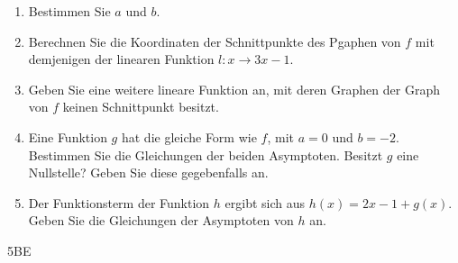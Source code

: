 \documentclass[a4paper,12pt]{article}
\begin{document}
    \begin{enumerate}[label={\alph*)}]
         \item Bestimmen Sie $a$ und $b$.
         \item Berechnen Sie die Koordinaten der Schnittpunkte des Pgaphen von $f$ mit demjenigen der linearen Funktion $l:x\rightarrow3x-1$.
         \item Geben Sie eine weitere lineare Funktion an, mit deren Graphen der Graph von $f$ keinen Schnittpunkt besitzt.
         \item Eine Funktion $g$ hat die gleiche Form wie $f$, mit $a=0$ und $b=-2$. Bestimmen Sie die Gleichungen der beiden Asymptoten. Besitzt $g$ eine Nullstelle? Geben Sie diese gegebenfalls an.
         \item Der Funktionsterm der Funktion $h$ ergibt sich aus $h(x)=2x-1+g(x)$. Geben Sie die Gleichungen der Asymptoten von $h$ an.
      \end{enumerate}


\begin{flushright}5BE \end{flushright}

\end{document}
